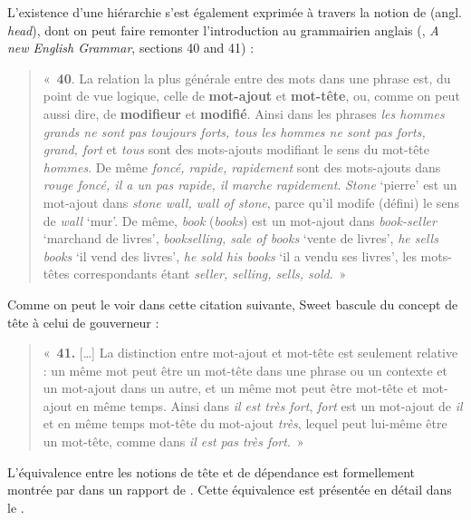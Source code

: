 {    L’existence d’une hiérarchie s’est également exprimée à travers la notion de  (angl. \textit{head}), dont on peut faire remonter l’introduction au grammairien anglais  (\citeyear{sweet1891new}, \textit{A new English Grammar}, sections 40 and 41) : 
    \begin{quote}«~\textbf{40}. La relation la plus générale entre des mots dans une phrase est, du point de vue logique, celle de \textbf{mot-ajout} et \textbf{mot-tête}, ou, comme on peut aussi dire, de \textbf{modifieur} et \textbf{modifié}. Ainsi dans les phrases \textit{les hommes grands ne sont pas toujours forts, tous les hommes ne sont pas forts, grand, fort} et \textit{tous} sont des mots-ajouts modifiant le sens du mot-tête \textit{hommes}. De même \textit{foncé, rapide, rapidement} sont des mots-ajouts dans \textit{rouge foncé, il a un pas rapide, il marche rapidement}. \textit{Stone} ‘pierre’ est un mot-ajout dans \textit{stone wall, wall of stone}, parce qu’il modife (défini) le sens de \textit{wall} ‘mur’. De même, \textit{book} (\textit{books}) est un mot-ajout dans \textit{book-seller} ‘marchand de livres’, \textit{bookselling, sale of books} ‘vente de livres’, \textit{he sells books} ‘il vend des livres’, \textit{he sold his books} ‘il a vendu ses livres’, les mots-têtes correspondants étant \textit{seller, selling, sells, sold}.~»\end{quote} 
    Comme on peut le voir dans cette citation suivante, Sweet bascule du concept de tête à celui de gouverneur : 
    \begin{quote}«~\textbf{41.} […] La distinction entre mot-ajout et mot-tête est seulement relative : un même mot peut être un mot-tête dans une phrase ou un contexte et un mot-ajout dans un autre, et un même mot peut être mot-tête et mot-ajout en même temps. Ainsi dans \textit{il est très fort}, \textit{fort} est un mot-ajout de \textit{il} et en même temps mot-tête du mot-ajout \textit{très}, lequel peut lui-même être un mot-tête, comme dans \textit{il est pas très fort}.~» \end{quote}

    L’équivalence entre les notions de tête et de dépendance est formellement montrée par  dans un rapport de \citeyear{lecerf1960programme}. Cette équivalence est présentée en détail dans le .

}

